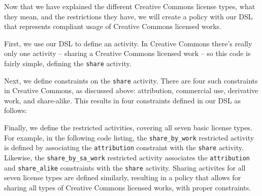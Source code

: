 Now that we have explained the different Creative Commons license types, what
they mean, and the restrictions they have, we will create a policy with our DSL
that represents compliant usage of Creative Commons licensed works.

First, we use our DSL to define an activity.  In Creative Commons there's
really only one activity --  sharing a Creative Commons licensed work -- so
this code is fairly simple, defining the \texttt{share} activity.



Next, we define constraints on the \texttt{share} activity.  There are four
such constraints in Creative Commons, as discussed above: attribution,
commercial use, derivative work, and share-alike.  This results in four
constraints defined in our DSL as follows:



Finally, we define the restricted activities, covering all seven basic license
types.  For example, in the following code listing, the
\texttt{share\_by\_work} restricted activity is defined by associating the
\texttt{attribution} constraint with the \texttt{share} activity. Likewise, the
\texttt{share\_by\_sa\_work} restricted activity associates the
\texttt{attribution} and \texttt{share\_alike} constraints with the
\texttt{share} activity.  Sharing activites for all seven license types are defined
similarly, resulting in a policy that allows for sharing all types of Creative
Commons licensed works, with proper constraints.


